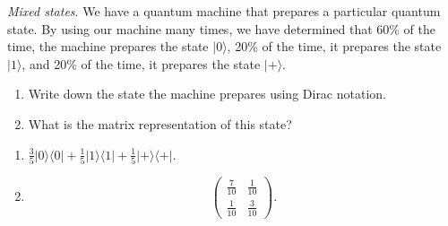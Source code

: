 \begin{exercise}
\emph{Mixed states}. We have a quantum machine that prepares a particular quantum state. By using our machine many times, we have determined that 60\% of the time, the machine prepares the state $|0\rangle$, 20\% of the time, it prepares the state $|1\rangle$, and 20\% of the time, it prepares the state $|+\rangle$.
\begin{enumerate}[label=(\alph*)]
    \item Write down the state the machine prepares using Dirac notation.
    \item What is the matrix representation of this state?
\end{enumerate}
\end{exercise}
\begin{solution}
\begin{enumerate}[label=(\alph*)]
    \item $\frac{3}{5}|0\rangle\langle0| + \frac{1}{5}|1\rangle\langle1| + \frac{1}{5}|+\rangle\langle+|$.
    \item 
    \begin{equation*}
        \begin{pmatrix}
            \frac{7}{10} & \frac{1}{10} \\
            \frac{1}{10} & \frac{3}{10}
        \end{pmatrix}.
    \end{equation*}
\end{enumerate}
\end{solution}


